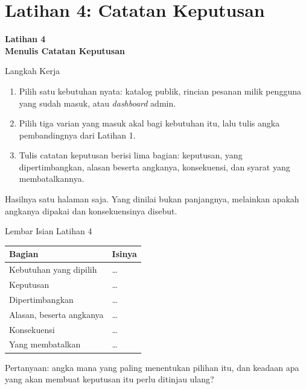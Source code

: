 \documentclass[aspectratio=169, table, 12pt]{beamer}
\begin{document}
\section{Latihan 4: Catatan Keputusan}

\begin{frame}{\hfill}
  \centering
  \Huge{\textbf{Latihan 4\\Menulis Catatan Keputusan}}
\end{frame}

\begin{frame}{{\Large Langkah Kerja}}
  \vspace{8pt}
  \begin{enumerate}
    \item Pilih satu kebutuhan nyata: katalog publik, rincian pesanan milik
          pengguna yang sudah masuk, atau \textit{dashboard} admin.
    \item Pilih tiga varian yang masuk akal bagi kebutuhan itu, lalu tulis
          angka pembandingnya dari Latihan 1.
    \item Tulis catatan keputusan berisi lima bagian: keputusan, yang
          dipertimbangkan, alasan beserta angkanya, konsekuensi, dan syarat
          yang membatalkannya.
  \end{enumerate}
  \vspace{8pt}
  {\small Hasilnya satu halaman saja. Yang dinilai bukan panjangnya,
  melainkan apakah angkanya dipakai dan konsekuensinya disebut.}
\end{frame}

\begin{frame}{{\Large Lembar Isian Latihan 4}}
  \vspace{6pt}
  \centering
  {\footnotesize
  \begin{tabularx}{\textwidth}{lY}
    \hline
    \textbf{Bagian} & \textbf{Isinya} \\
    \hline
    Kebutuhan yang dipilih & \dots \\
    \hline
    Keputusan & \dots \\
    \hline
    Dipertimbangkan & \dots \\
    \hline
    Alasan, beserta angkanya & \dots \\
    \hline
    Konsekuensi & \dots \\
    \hline
    Yang membatalkan & \dots \\
    \hline
  \end{tabularx}}

  \vspace{6pt}
  {\footnotesize Pertanyaan: angka mana yang paling menentukan pilihan itu,
  dan keadaan apa yang akan membuat keputusan itu perlu ditinjau ulang?}
\end{frame}
\end{document}

